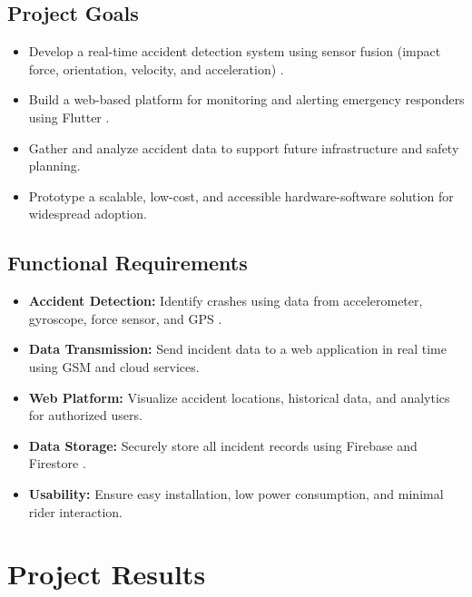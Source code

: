 \documentclass[12pt]{article}
\begin{document}
\subsection{Project Goals}
\begin{itemize}
  \item Develop a real-time accident detection system using sensor fusion (impact force, orientation, velocity, and acceleration) \cite{mpu6050}.
  \item Build a web-based platform for monitoring and alerting emergency responders using Flutter \cite{flutter}.
  \item Gather and analyze accident data to support future infrastructure and safety planning.
  \item Prototype a scalable, low-cost, and accessible hardware-software solution for widespread adoption.
\end{itemize}

\subsection{Functional Requirements}
\begin{itemize}
  \item \textbf{Accident Detection:} Identify crashes using data from accelerometer, gyroscope, force sensor, and GPS \cite{mpu6050}.
  \item \textbf{Data Transmission:} Send incident data to a web application in real time using GSM and cloud services.
  \item \textbf{Web Platform:} Visualize accident locations, historical data, and analytics for authorized users.
  \item \textbf{Data Storage:} Securely store all incident records using Firebase and Firestore \cite{firebase}.
  \item \textbf{Usability:} Ensure easy installation, low power consumption, and minimal rider interaction.
\end{itemize}

\section{Project Results}
\end{document}

